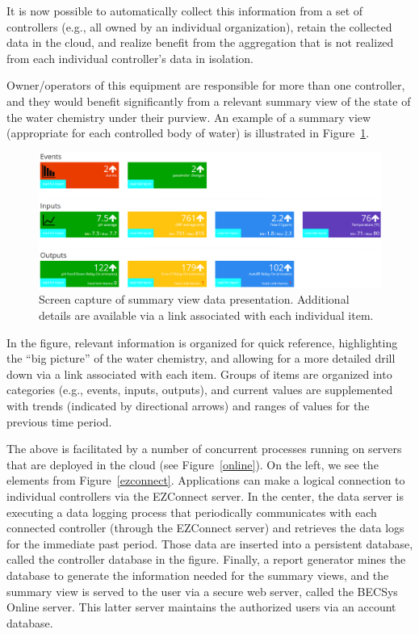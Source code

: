 It is now possible to automatically
collect this information from a set of controllers (e.g., all
owned by an individual organization), retain the collected data in
the cloud, and realize benefit from the aggregation that is not realized
from each individual controller's data in isolation.

Owner/operators of this equipment are responsible for 
more than one controller, and they would benefit significantly from a relevant
summary view of the state of the water chemistry under their purview.
An example of a summary view (appropriate for each controlled body of water)
is illustrated in Figure~\ref{screenshot}.

\begin{figure}[htbp]
 \center
\includegraphics[width=\columnwidth]{screenshot}
    \caption{Screen capture of summary view data presentation. Additional
details are available via a link associated with each individual item.}
    \label{screenshot}
\end{figure}

In the figure, relevant information is organized for quick reference,
highlighting the ``big picture'' of the water chemistry, and allowing for
a more detailed drill down via a link associated with each item.
Groups of items are organized into categories (e.g., events, inputs,
outputs), and current values are supplemented with trends (indicated
by directional arrows) and ranges of values for the previous time period.

The above is facilitated by a number of concurrent processes running
on servers that are deployed in the cloud (see Figure~\ref{online}).
On the left, we see the elements from Figure~\ref{ezconnect}.
Applications can make a logical connection to individual controllers
via the EZConnect server.
In the center, the data server is executing a
data logging process that periodically communicates with each connected
controller (through the EZConnect server) and retrieves the data logs
for the immediate past period.
Those data are inserted into a persistent database, called the
controller database in the figure.
Finally,
a report generator mines the database to generate the information needed
for the summary views, and the summary view is served to the
user via a secure web server, called the BECSys Online server.
This latter server maintains the authorized users via an account
database.

